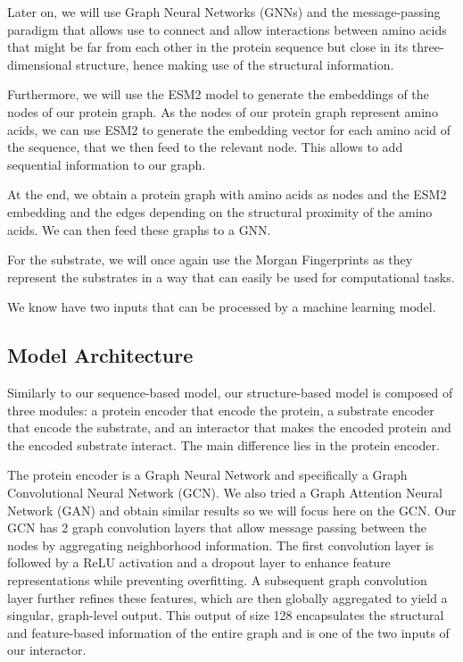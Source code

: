 Later on, we will use Graph Neural Networks (GNNs)
and the message-passing paradigm that allows use to connect and allow interactions between amino acids that
might be far from each other in the protein sequence but close in its three-dimensional structure, hence making 
use of the structural information.

Furthermore, we will use the ESM2 model to generate the embeddings of the nodes of our protein graph. \cite{lin2022language} As the nodes
of our protein graph represent amino acids, we can use ESM2 to generate the embedding vector for each amino acid
of the sequence, that we then feed to the relevant node. This allows to add sequential information to our graph.

At the end, we obtain a protein graph with amino acids as nodes and the ESM2 embedding and the edges depending on
the structural proximity of the amino acids. We can then feed these graphs to a GNN.

For the substrate, we will once again use the Morgan Fingerprints as they represent the substrates in a way 
that can easily be used for computational tasks.

We know have two inputs that can be processed by a machine learning model.

\subsection{Model Architecture}

Similarly to our sequence-based model, our structure-based model is composed of three modules: a protein encoder 
that encode the protein, a substrate encoder that encode the substrate, and an interactor that makes the 
encoded protein and the encoded substrate interact. The main difference lies in the protein encoder.

The protein encoder is a Graph Neural Network and specifically a Graph Convolutional Neural Network (GCN). We also 
tried a Graph Attention Neural Network (GAN) and obtain similar results so we will focus here on the GCN. Our GCN
has 2 graph convolution layers that allow message passing between the nodes by aggregating neighborhood 
information. The first convolution layer is followed by a ReLU activation and a dropout layer to enhance 
feature representations while preventing overfitting. A subsequent graph convolution layer further refines 
these features, which are then globally aggregated to yield a singular, graph-level output. This output of size 128
encapsulates the structural and feature-based information of the entire graph and is one of the two inputs of 
our interactor. 

